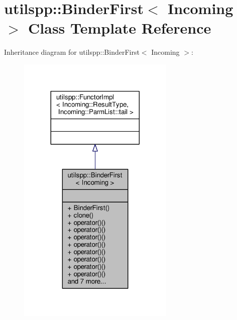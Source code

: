 \hypertarget{classutilspp_1_1BinderFirst}{\section{utilspp\-:\-:Binder\-First$<$ Incoming $>$ Class Template Reference}
\label{classutilspp_1_1BinderFirst}
}


Inheritance diagram for utilspp\-:\-:Binder\-First$<$ Incoming $>$\-:
\nopagebreak
\begin{figure}[H]
\begin{center}
\leavevmode
\includegraphics[width=212pt]{classutilspp_1_1BinderFirst__inherit__graph}
\end{center}
\end{figure}


